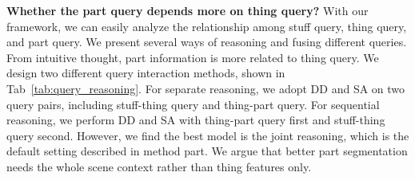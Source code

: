 \noindent
\textbf{Whether the part query depends more on thing query?} With our framework, we can easily analyze the relationship among stuff query, thing query, and part query. We present several ways of reasoning and fusing different queries. From intuitive thought, part information is more related to thing query. We design two different query interaction methods, shown in Tab~\ref{tab:query_reasoning}. For separate reasoning, we adopt DD and SA on two query pairs, including stuff-thing query and thing-part query. For sequential reasoning, we perform DD and SA with thing-part query first and stuff-thing query second. However, we find the best model is the joint reasoning, which is the default setting described in method part. We argue that better part segmentation needs the whole scene context rather than thing features only. 

\begin{table*}[!t]
    \footnotesize
	\centering
     \hfill
     \hfill
     \hfill
     \caption{\small More analysis using our Panoptic-PartFormer.}
\end{table*}


